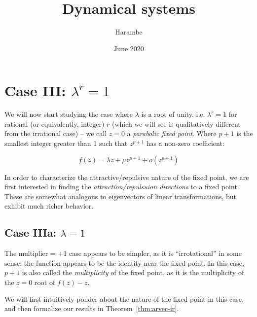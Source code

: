 \documentclass{article}
\title{Dynamical systems}
\author{Harambe}
\date{June 2020}
\begin{document}
\maketitle

\section{Case III: $\lambda^r=1$}

We will now start studying the case where $\lambda$ is a root of unity, i.e. $\lambda^r=1$ for rational (or equivalently, integer) $r$ (which we will see is qualitatively different from the irrational case) -- we call $z=0$ a \textit{parabolic fixed point}. Where $p+1$ is the smallest integer greater than 1 such that $z^{p+1}$ has a non-zero coefficient: 

\begin{equation}
    \label{eq:f}
    f(z) = \lambda z + \mu z^{p + 1} + o(z^{p+1})
\end{equation}

In order to characterize the attractive/repulsive nature of the fixed point, we are first interested in finding the \textit{attraction/repulsuion directions} to a fixed point. These are somewhat analogous to eigenvectors of linear transformations, but exhibit much richer behavior.

\subsection{Case IIIa: $\lambda = 1$}
The multiplier = +1 case appears to be simpler, as it is ``irrotational'' in some sense: the function appears to be the identity near the fixed point. In this case, $p+1$ is also called the \textit{multiplicity} of the fixed point, as it is the multiplicity of the $z=0$ root of $f(z)-z$.

We will first intuitively ponder about the nature of the fixed point in this case, and then formalize our results in Theorem~\ref{thm:arvec-ir}.
\end{document}
